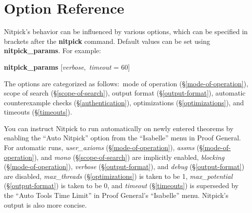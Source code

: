 \documentclass[a4paper,12pt]{article}
\begin{document}
\section{Option Reference}
\label{option-reference}

\def\flushitem#1{\item[]\noindent\kern-\leftmargin \textbf{#1}}
\def\qty#1{$\left<\textit{#1}\right>$}
\def\qtybf#1{$\mathbf{\left<\textbf{\textit{#1}}\right>}$}
\def\optrue#1#2{\flushitem{\textit{#1} $\bigl[$= \qtybf{bool}$\bigr]$\quad [\textit{true}]\hfill (neg.: \textit{#2})}\nopagebreak\\[\parskip]}
\def\opfalse#1#2{\flushitem{\textit{#1} $\bigl[$= \qtybf{bool}$\bigr]$\quad [\textit{false}]\hfill (neg.: \textit{#2})}\nopagebreak\\[\parskip]}
\def\opsmart#1#2{\flushitem{\textit{#1} $\bigl[$= \qtybf{bool\_or\_smart}$\bigr]$\quad [\textit{smart}]\hfill (neg.: \textit{#2})}\nopagebreak\\[\parskip]}
\def\opnodefault#1#2{\flushitem{\textit{#1} = \qtybf{#2}} \nopagebreak\\[\parskip]}
\def\opdefault#1#2#3{\flushitem{\textit{#1} = \qtybf{#2}\quad [\textit{#3}]} \nopagebreak\\[\parskip]}
\def\oparg#1#2#3{\flushitem{\textit{#1} \qtybf{#2} = \qtybf{#3}} \nopagebreak\\[\parskip]}
\def\opargbool#1#2#3{\flushitem{\textit{#1} \qtybf{#2} $\bigl[$= \qtybf{bool}$\bigr]$\hfill (neg.: \textit{#3})}\nopagebreak\\[\parskip]}
\def\opargboolorsmart#1#2#3{\flushitem{\textit{#1} \qtybf{#2} $\bigl[$= \qtybf{bool\_or\_smart}$\bigr]$\hfill (neg.: \textit{#3})}\nopagebreak\\[\parskip]}

Nitpick's behavior can be influenced by various options, which can be specified
in brackets after the \textbf{nitpick} command. Default values can be set
using \textbf{nitpick\_\allowbreak params}. For example:

\prew
\textbf{nitpick\_params} [\textit{verbose}, \,\textit{timeout} = 60]
\postw

The options are categorized as follows:\ mode of operation
(\S\ref{mode-of-operation}), scope of search (\S\ref{scope-of-search}), output
format (\S\ref{output-format}), automatic counterexample checks
(\S\ref{authentication}), optimizations
(\S\ref{optimizations}), and timeouts (\S\ref{timeouts}).

You can instruct Nitpick to run automatically on newly entered theorems by
enabling the ``Auto Nitpick'' option from the ``Isabelle'' menu in Proof
General. For automatic runs, \textit{user\_axioms} (\S\ref{mode-of-operation}),
\textit{assms} (\S\ref{mode-of-operation}), and \textit{mono}
(\S\ref{scope-of-search}) are implicitly enabled, \textit{blocking}
(\S\ref{mode-of-operation}), \textit{verbose} (\S\ref{output-format}), and
\textit{debug} (\S\ref{output-format}) are disabled, \textit{max\_threads}
(\S\ref{optimizations}) is taken to be 1, \textit{max\_potential}
(\S\ref{output-format}) is taken to be 0, and \textit{timeout}
(\S\ref{timeouts}) is superseded by the ``Auto Tools Time Limit'' in
Proof General's ``Isabelle'' menu. Nitpick's output is also more concise.
\end{document}
